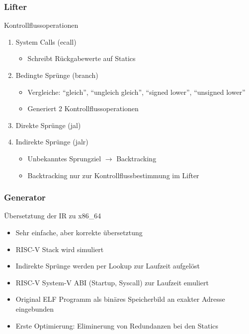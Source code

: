 \begin{frame}
    \frametitle{Lifter}{Kontrollflussoperationen}
    \pause
    \begin{enumerate}
        \setlength\itemsep{0.5em}
        \item System Calls (ecall)
              \begin{itemize}
                  \item Schreibt Rückgabewerte auf Statics
              \end{itemize}
              \pause
        \item Bedingte Sprünge (branch)
              \begin{itemize}
                  \item Vergleiche: "`gleich"', "`ungleich gleich"', "`signed lower"', "`unsigned lower"'
                  \item Generiert 2 Kontrollflussoperationen
              \end{itemize}
              \pause
        \item Direkte Sprünge (jal)
              \pause
        \item Indirekte Sprünge (jalr)
              \begin{itemize}
                  \item Unbekanntes Sprungziel $\rightarrow$ Backtracking
                  \item Backtracking nur zur Kontrollflussbestimmung im Lifter
              \end{itemize}
    \end{enumerate}
\end{frame}
\clearpage

\note[itemize]{

}



\begin{frame}
    \frametitle{Generator}{Übersetztung der IR zu x86\_64}
    \pause
    \begin{itemize}
        \item Sehr einfache, aber korrekte übersetztung
              \pause
        \item RISC-V Stack wird simuliert %
              \pause
        \item Indirekte Sprünge werden per Lookup zur Laufzeit aufgelöst
              \pause
        \item RISC-V System-V ABI (Startup, Syscall) zur Laufzeit emuliert
              \pause
        \item Original ELF Programm als binäres Speicherbild an exakter Adresse eingebunden
              \pause
        \item Erste Optimierung: Eliminerung von Redundanzen bei den Statics
    \end{itemize}
\end{frame}
\clearpage

